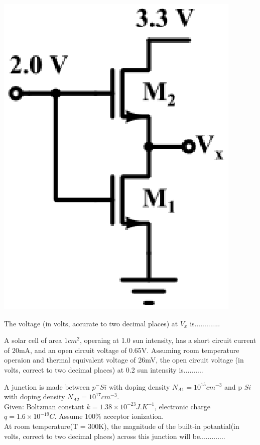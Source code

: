 \includegraphics[scale=0.5]{53}

The voltage (in volts, accurate to two decimal places) at $V_x$ is.............

\item A solar cell of area $1cm^2$, operaing at 1.0 sun intensity, has a short circuit current of 20mA, and an open circuit voltage of 0.65V. Assuming room temperature operaion and thermal equivalent voltage of 26mV, the open circuit voltage (in volts, correct to two decimal places) at 0.2 sun intensity is..........

\item A junction is made between $p^{-}Si$ with doping density $N_{A1} = 10^{15}cm^{-3}$ and p $Si$ with doping density 
$N_{A2} = 10^{17}cm^{-3}$.\\
Given: Boltzman constant $k = 1.38 \times 10^{-23}J.K^{-1}$, electronic charge $q = 1.6 \times 10^{-19}C$. Assume $100\%$ acceptor ionization.\\
At room temperature(T = 300K), the magnitude of the built-in potantial(in volts, correct to two decimal places) across this junction will be.............

